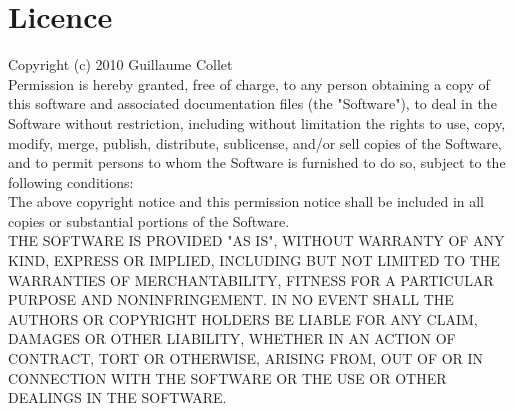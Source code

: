 \documentclass[12pt]{report}
\begin{document}


\newpage
\section*{Licence}
Copyright (c) 2010 Guillaume Collet\\
 
Permission is hereby granted, free of charge, to any person obtaining a copy
of this software and associated documentation files (the "Software"), to deal
in the Software without restriction, including without limitation the rights
to use, copy, modify, merge, publish, distribute, sublicense, and/or sell
copies of the Software, and to permit persons to whom the Software is
furnished to do so, subject to the following conditions:\\

The above copyright notice and this permission notice shall be included in
all copies or substantial portions of the Software. \\

THE SOFTWARE IS PROVIDED "AS IS", WITHOUT WARRANTY OF ANY KIND, EXPRESS OR
IMPLIED, INCLUDING BUT NOT LIMITED TO THE WARRANTIES OF MERCHANTABILITY,
FITNESS FOR A PARTICULAR PURPOSE AND NONINFRINGEMENT. IN NO EVENT SHALL THE
AUTHORS OR COPYRIGHT HOLDERS BE LIABLE FOR ANY CLAIM, DAMAGES OR OTHER
LIABILITY, WHETHER IN AN ACTION OF CONTRACT, TORT OR OTHERWISE, ARISING FROM,
OUT OF OR IN CONNECTION WITH THE SOFTWARE OR THE USE OR OTHER DEALINGS IN
THE SOFTWARE. 
\end{document}
